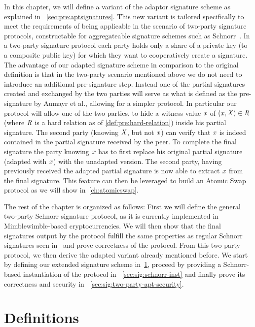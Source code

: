 In this chapter, we will define a variant of the adaptor signature scheme as explained in ~\cref{sec:pre:aptsignatures}.
This new variant is tailored specifically to meet the requirements of being applicable in the scenario of two-party signature protocols, constructable for aggregateable signature schemes such as Schnorr~\cite{maxwell2019simple}.
In a two-party signature protocol each party holds only a share of a private key (to a composite public key) for which they want to cooperatively create a signature.
The advantage of our adapted signature scheme in comparison to the original definition is that in the two-party scenario mentioned above we do not need to introduce an additional pre-signature step.
Instead one of the partial signatures created and exchanged by the two parties will serve as what is defined as the pre-signature by Aumayr et al., allowing for a simpler protocol.
In particular our protocol will allow one of the two parties, to hide a witness value $\mathit{x}$ of $(\mathit{x}, \mathit{X}) \in \mathit{R}$ (where $\mathit{R}$ is a hard relation as of \cref{def:pre:hard-relation}) inside his partial signature.
The second party (knowing $\mathit{X}$, but not $\mathit{x}$) can verify that $\mathit{x}$ is indeed contained in the partial signature received by the peer.
To complete the final signature the party knowing $\mathit{x}$ has to first replace his original partial signature (adapted with $\mathit{x}$) with the unadapted version.
The second party, having previously received the adapted partial signature is now able to extract $\mathit{x}$ from the final signature.
This feature can then be leveraged to build an Atomic Swap protocol as we will show in~\cref{ch:atomicswap}.

The rest of the chapter is organized as follows:
First we will define the general two-party Schnorr signature protocol, as it is currently implemented in Mimblewimble-based cryptocurrencies.
We will then show that the final signatures output by the protocol fulfill the same properties as regular Schnorr signatures seen in~\cite{schnorr1989efficient} and prove correctness of the protocol.
From this two-party protocol, we then derive the adapted variant already mentioned before.
We start by defining our extended signature scheme in~\cref{sec:sig:definitions}, proceed by providing a Schnorr-based instantiation of the protocol in ~\cref{sec:sig:schnorr-inst} and finally prove its correctness and security in ~\cref{sec:sig:two-party-apt-security}.

\section{Definitions} \label{sec:sig:definitions}


